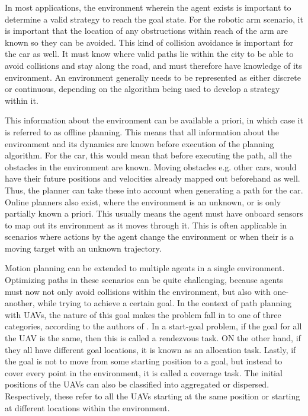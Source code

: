In most applications, the environment wherein the agent exists is important to determine a valid strategy to reach the goal state. For the robotic arm scenario, it is important that the location of any obstructions within reach of the arm are known so they can be avoided. This kind of collision avoidance is important for the car as well. It must know where valid paths lie within the city to be able to avoid collisions and stay along the road, and must therefore have knowledge of its environment. An environment generally needs to be represented as either discrete or continuous, depending on the algorithm being used to develop a strategy within it.

This information about the environment can be available a priori, in which case it is referred to as offline planning. This means that all information about the environment and its dynamics are known before execution of the planning algorithm. For the car, this would mean that before executing the path, all the obstacles in the environment are known. Moving obstacles e.g. other cars, would have their future positions and velocities already mapped out beforehand as well. Thus, the planner can take these into account when generating a path for the car. Online planners also exist, where the environment is an unknown, or is only partially known a priori. This usually means the agent must have onboard sensors to map out its environment as it moves through it. This is often applicable in scenarios where actions by the agent change the environment or when their is a moving target with an unknown trajectory.

Motion planning can be extended to multiple agents in a single environment. Optimizing paths in these scenarios can be quite challenging, because agents must now not only avoid collisions within the environment, but also with one-another, while trying to achieve a certain goal. In the context of path planning with \acsp{UAV}, the nature of this goal makes the problem fall in to one of three categories, according to the authors of \cite{Zhang2020}. In a start-goal problem, if the goal for all the \acs{UAV} is the same, then this is called a rendezvous task. ON the other hand, if they all have different goal locations, it is known as an allocation task. Lastly, if the goal is not to move from some starting position to a goal, but instead to cover every point in the environment, it is called a coverage task. The initial positions of the \acsp{UAV} can also be  classified into aggregated or dispersed. Respectively, these refer to all the UAVs starting at the same position or starting at different locations within the environment.

